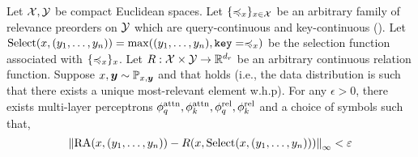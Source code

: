 \begin{theorem*}%
  Let ${\mathcal{X}}, {\mathcal{Y}}$ be compact Euclidean spaces. Let $\{\preccurlyeq_x\}_{x \in {\mathcal{X}}}$ be an arbitrary family of relevance preorders on ${\mathcal{Y}}$ which are query-continuous and key-continuous (). Let $\mathrm{Select}(x, (y_1, \ldots, y_n)) = \max((y_1, \ldots, y_n), \mathtt{key}=\preccurlyeq_x)$ be the selection function associated with $\{\preccurlyeq_x\}_{x}$. Let $R: {\mathcal{X}} \times {\mathcal{Y}} \to \mathbb{R}^{d_r}$ be an arbitrary continuous relation function. Suppose $x, \bm{y} \sim {\mathbb{P}}_{x, \bm{y}}$ and that  holds (i.e., the data distribution is such that there exists a unique most-relevant element w.h.p). For any $\epsilon > 0$, there exists multi-layer perceptrons $\phi_q^{\mathrm{attn}}, \phi_k^{\mathrm{attn}}, \phi_q^{\mathrm{rel}}, \phi_k^{\mathrm{rel}}$ and a choice of symbols such that,
  \begin{equation*}
    \left\lVert\mathrm{RA}(x, (y_1, \ldots, y_n)) - R(x, \mathrm{Select}(x, (y_1, \ldots, y_n)))\right\rVert_{\infty} < \varepsilon
  \end{equation*}
\end{theorem*}

